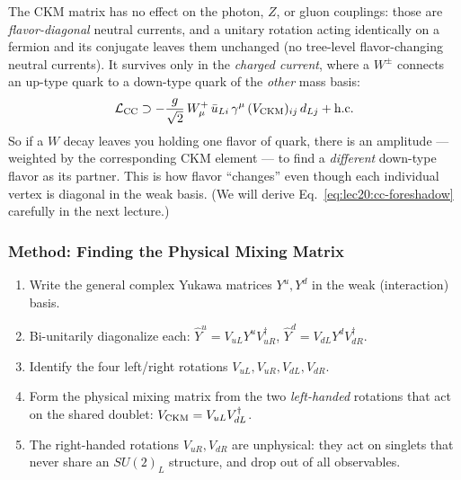 The CKM matrix has no effect on the photon, $Z$, or gluon couplings:
those are \emph{flavor-diagonal} neutral currents, and a unitary
rotation acting identically on a fermion and its conjugate leaves them
unchanged (no tree-level flavor-changing neutral currents). It survives
only in the \emph{charged current}, where a $W^\pm$ connects an
up-type quark to a down-type quark of the \emph{other} mass basis:
\begin{equation}
  \mathcal{L}_{\rm CC}
  \supset
  -\frac{g}{\sqrt2}\,W^+_\mu\,
  \bar u_{Li}\,\gamma^\mu\,(V_{\rm CKM})_{ij}\,d_{Lj}
  + \text{h.c.}
  \label{eq:lec20:cc-foreshadow}
\end{equation}
So if a $W$ decay leaves you holding one flavor of quark, there is an
amplitude --- weighted by the corresponding CKM element --- to find a
\emph{different} down-type flavor as its partner. This is how flavor
``changes'' even though each individual vertex is diagonal in the weak
basis. (We will derive Eq.~\eqref{eq:lec20:cc-foreshadow} carefully in
the next lecture.)

\subsubsection*{Method: Finding the Physical Mixing Matrix}
\begin{enumerate}
  \item Write the general complex Yukawa matrices $Y^u, Y^d$ in the weak
        (interaction) basis.
  \item Bi-unitarily diagonalize each:
        $\hat Y^u = V_{uL}Y^u V_{uR}^\dagger$,
        $\hat Y^d = V_{dL}Y^d V_{dR}^\dagger$.
  \item Identify the four left/right rotations
        $V_{uL},V_{uR},V_{dL},V_{dR}$.
  \item Form the physical mixing matrix from the two \emph{left-handed}
        rotations that act on the shared doublet:
        $V_{\rm CKM} = V_{uL}V_{dL}^\dagger$.
  \item The right-handed rotations $V_{uR},V_{dR}$ are unphysical: they
        act on singlets that never share an $SU(2)_L$ structure, and
        drop out of all observables.
\end{enumerate}

